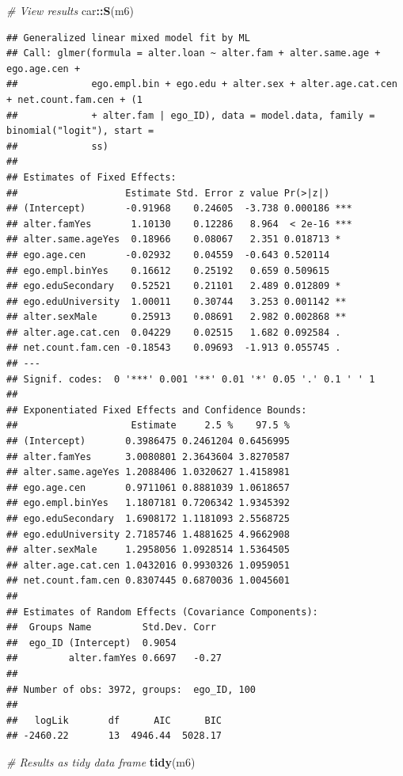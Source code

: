 \documentclass[
]{book}
\newenvironment{Shaded}{\begin{snugshade}}{\end{snugshade}}
\newcommand{\CommentTok}[1]{\textcolor[rgb]{0.56,0.35,0.01}{\textit{#1}}}
\newcommand{\FunctionTok}[1]{\textcolor[rgb]{0.13,0.29,0.53}{\textbf{#1}}}
\newcommand{\NormalTok}[1]{#1}
\newcommand{\SpecialCharTok}[1]{\textcolor[rgb]{0.81,0.36,0.00}{\textbf{#1}}}
\begin{document}
\begin{Shaded}
\begin{Highlighting}[]
\CommentTok{\# View results}
\NormalTok{car}\SpecialCharTok{::}\FunctionTok{S}\NormalTok{(m6)}
\end{Highlighting}
\end{Shaded}

\begin{verbatim}
## Generalized linear mixed model fit by ML
## Call: glmer(formula = alter.loan ~ alter.fam + alter.same.age + ego.age.cen +
##             ego.empl.bin + ego.edu + alter.sex + alter.age.cat.cen + net.count.fam.cen + (1
##             + alter.fam | ego_ID), data = model.data, family = binomial("logit"), start =
##             ss)
## 
## Estimates of Fixed Effects:
##                   Estimate Std. Error z value Pr(>|z|)    
## (Intercept)       -0.91968    0.24605  -3.738 0.000186 ***
## alter.famYes       1.10130    0.12286   8.964  < 2e-16 ***
## alter.same.ageYes  0.18966    0.08067   2.351 0.018713 *  
## ego.age.cen       -0.02932    0.04559  -0.643 0.520114    
## ego.empl.binYes    0.16612    0.25192   0.659 0.509615    
## ego.eduSecondary   0.52521    0.21101   2.489 0.012809 *  
## ego.eduUniversity  1.00011    0.30744   3.253 0.001142 ** 
## alter.sexMale      0.25913    0.08691   2.982 0.002868 ** 
## alter.age.cat.cen  0.04229    0.02515   1.682 0.092584 .  
## net.count.fam.cen -0.18543    0.09693  -1.913 0.055745 .  
## ---
## Signif. codes:  0 '***' 0.001 '**' 0.01 '*' 0.05 '.' 0.1 ' ' 1
## 
## Exponentiated Fixed Effects and Confidence Bounds:
##                    Estimate     2.5 %    97.5 %
## (Intercept)       0.3986475 0.2461204 0.6456995
## alter.famYes      3.0080801 2.3643604 3.8270587
## alter.same.ageYes 1.2088406 1.0320627 1.4158981
## ego.age.cen       0.9711061 0.8881039 1.0618657
## ego.empl.binYes   1.1807181 0.7206342 1.9345392
## ego.eduSecondary  1.6908172 1.1181093 2.5568725
## ego.eduUniversity 2.7185746 1.4881625 4.9662908
## alter.sexMale     1.2958056 1.0928514 1.5364505
## alter.age.cat.cen 1.0432016 0.9930326 1.0959051
## net.count.fam.cen 0.8307445 0.6870036 1.0045601
## 
## Estimates of Random Effects (Covariance Components):
##  Groups Name         Std.Dev. Corr 
##  ego_ID (Intercept)  0.9054        
##         alter.famYes 0.6697   -0.27
## 
## Number of obs: 3972, groups:  ego_ID, 100
## 
##   logLik       df      AIC      BIC 
## -2460.22       13  4946.44  5028.17
\end{verbatim}

\begin{Shaded}
\begin{Highlighting}[]
\CommentTok{\# Results as tidy data frame}
\FunctionTok{tidy}\NormalTok{(m6)}
\end{Highlighting}
\end{Shaded}
\end{document}
